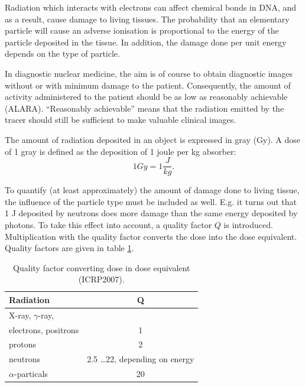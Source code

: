 \documentclass[11pt,oneside]{article}
\begin{document}
Radiation which interacts with electrons can affect chemical bonds in
DNA, and as a result, cause damage to living tissues. The probability
that an elementary particle will cause an adverse ionisation is
proportional to the energy of the particle deposited in the tissue. In
addition, the damage done per unit energy depends on the type of
particle.

In diagnostic nuclear medicine, the aim is of course to obtain
diagnostic images without or with minimum damage to the
patient. Consequently, the amount of activity administered to the
patient should be as low as reasonably achievable (ALARA).
``Reasonably achievable'' means that the radiation emitted by the
tracer should still be sufficient to make valuable clinical images.

The amount of radiation deposited in an object is expressed in gray (Gy). A
dose of 1 gray is defined as the deposition of 1 joule per kg absorber:
\begin{equation}
  1 Gy = 1 \frac{J}{kg}.
\end{equation}

To quantify (at least approximately) the amount of damage done to living
tissue, the influence of the particle type must be included as well. E.g. it
turns out that 1 J deposited by neutrons does more damage than the same energy
deposited by photons. To take this effect into account, a quality factor $Q$
is introduced. Multiplication with the quality factor converts the dose into
the dose equivalent. Quality factors are given in table \ref{tab:qualfactor}.
%
\begin{table}[h]
\begin{center}
\caption{Quality factor converting dose in dose equivalent (ICRP2007).}
\label{tab:qualfactor}
\begin{tabular}{|l|c|}
\hline
Radiation                          & Q \\
\hline
\hline
X-ray, $\gamma$-ray,               & \\
electrons, positrons               & 1 \\
\hline
protons                            & 2 \\
neutrons                           & 2.5 \ldots 22, depending on energy \\
\hline
$\alpha$-particals                 & 20 \\
\hline
\end{tabular}
\end{center}
\end{table}
\end{document}
